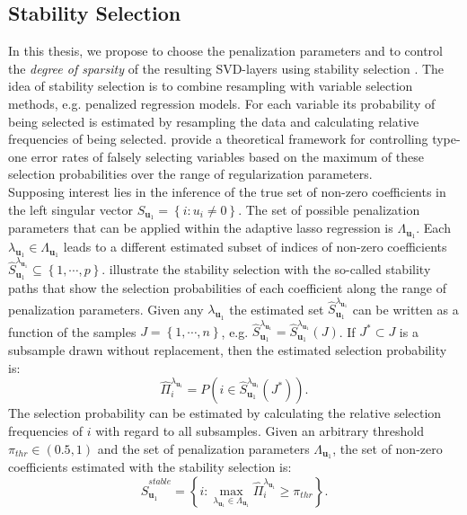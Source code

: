 \subsection{Stability Selection}
In this thesis, we propose to choose the penalization parameters and to control the \textit{degree of sparsity} of the resulting SVD-layers using stability selection \cite{Meinshausen2010}. The idea of stability selection is to combine resampling with variable selection methods, e.g. penalized regression models. For each variable its probability of being selected is estimated by resampling the data and calculating relative frequencies of being selected. \citet{Meinshausen2010} provide a theoretical framework for controlling type-one error rates of falsely selecting variables based on the maximum of these selection probabilities over the range of regularization parameters. \\
Supposing interest lies in the inference of the true set of non-zero coefficients in the left singular vector $S_{\mathbf{u}_{1}}=\left\{i:u_{i} \neq 0 \right\}$. The set of possible penalization parameters that can be applied within the adaptive lasso regression is $\Lambda_{\mathbf{u}_{1}}$. Each $\lambda_{\mathbf{u}_{1}} \in \Lambda_{\mathbf{u}_{1}}$ leads to a different estimated subset of indices of non-zero coefficients $\hat{S}^{\lambda_{\mathbf{u}_{1}}}_{\mathbf{u}_{1}}\subseteq\left\{1,\cdots,p\right\}$. 
\citet{Meinshausen2010} illustrate the stability selection with the so-called stability paths that show the 
selection probabilities of each coefficient along the range of penalization parameters. Given any $\lambda_{\mathbf{u}_{1}}$ the estimated set $\hat{S}^{\lambda_{\mathbf{u}_{1}}}_{\mathbf{u}_{1}}$ can be written as a function of the samples $J=\left\{1,\cdots,n \right\} $, e.g. $\hat{S}^{\lambda_{\mathbf{u}_{1}}}_{\mathbf{u}_{1}}=\hat{S}^{\lambda_{\mathbf{u}_{1}}}_{\mathbf{u}_{1}}(J)$. If $J^{*} \subset J$ is a subsample drawn without replacement, then the estimated selection probability is:
\begin{equation}
 \hat{\Pi}_{i}^{\lambda_{\mathbf{u}_{1}}}=P(i \in \hat{S}^{\lambda_{\mathbf{u}_{1}}}_{\mathbf{u}_{1}}(J^{*})).
\end{equation}
The selection probability can be estimated by calculating the relative selection frequencies of $i$ with regard to all subsamples.
Given an arbitrary threshold $\pi_{thr} \in (0.5,1)$ and the set of penalization parameters $\Lambda_{\mathbf{u}_{1}}$, the set of non-zero coefficients estimated with the stability selection is:
\begin{equation} 
 \hat{S}_{\mathbf{u}_{1}}^{stable}=\left\{i: \max_{\lambda_{\mathbf{u}_{1}} \in \Lambda_{\mathbf{u}_{1}}}\hat{\Pi}_{i}^{\lambda_{\mathbf{u}_{1}}} \geq \pi_{thr} \right\}.
\end{equation}
